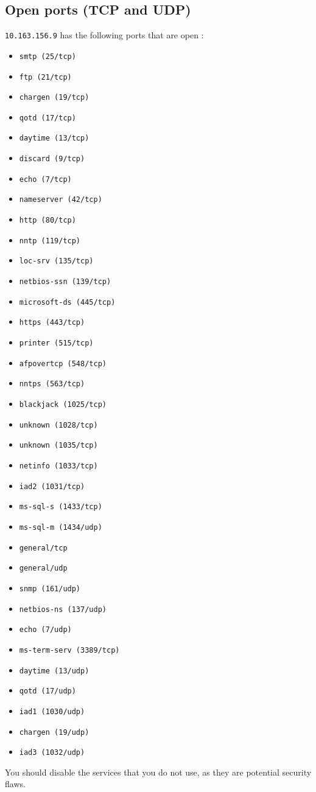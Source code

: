 \documentclass{article}
\begin{document}
\subsection{Open ports (TCP and UDP)}
\verb+10.163.156.9+ has the following ports that are open : 
\begin{itemize}
\item\verb+smtp (25/tcp)+
\item\verb+ftp (21/tcp)+
\item\verb+chargen (19/tcp)+
\item\verb+qotd (17/tcp)+
\item\verb+daytime (13/tcp)+
\item\verb+discard (9/tcp)+
\item\verb+echo (7/tcp)+
\item\verb+nameserver (42/tcp)+
\item\verb+http (80/tcp)+
\item\verb+nntp (119/tcp)+
\item\verb+loc-srv (135/tcp)+
\item\verb+netbios-ssn (139/tcp)+
\item\verb+microsoft-ds (445/tcp)+
\item\verb+https (443/tcp)+
\item\verb+printer (515/tcp)+
\item\verb+afpovertcp (548/tcp)+
\item\verb+nntps (563/tcp)+
\item\verb+blackjack (1025/tcp)+
\item\verb+unknown (1028/tcp)+
\item\verb+unknown (1035/tcp)+
\item\verb+netinfo (1033/tcp)+
\item\verb+iad2 (1031/tcp)+
\item\verb+ms-sql-s (1433/tcp)+
\item\verb+ms-sql-m (1434/udp)+
\item\verb+general/tcp+
\item\verb+general/udp+
\item\verb+snmp (161/udp)+
\item\verb+netbios-ns (137/udp)+
\item\verb+echo (7/udp)+
\item\verb+ms-term-serv (3389/tcp)+
\item\verb+daytime (13/udp)+
\item\verb+qotd (17/udp)+
\item\verb+iad1 (1030/udp)+
\item\verb+chargen (19/udp)+
\item\verb+iad3 (1032/udp)+
\end{itemize}
You should disable the services that you do not use, as they are potential security flaws.
\end{document}
